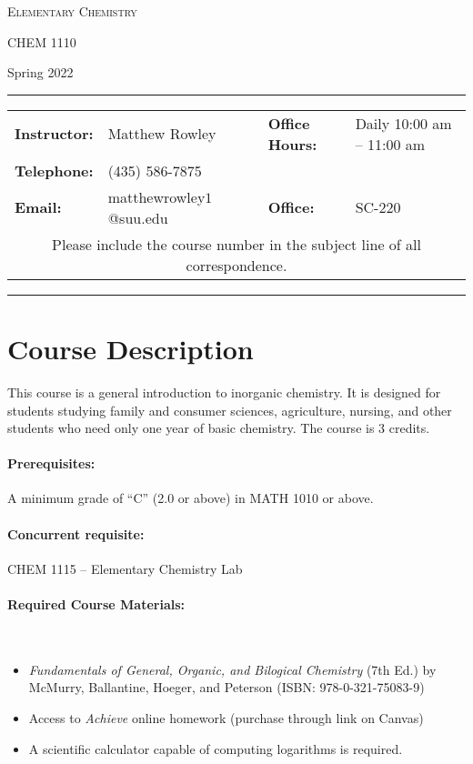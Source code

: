 \documentclass[12pt, letterpaper]{article}
\begin{document}
\begin{center}
	{\Large \textsc{Elementary Chemistry}}

	CHEM 1110
\end{center}
\begin{center}
	{\large Spring 2022}
\end{center}
\begin{center}
	\rule{0.99\textwidth}{0.4pt}
	\begin{tabular}{llcll}
		\textbf{Instructor:} & Matthew Rowley & & \textbf{Office Hours:} & Daily 10:00 am -- 11:00 am \\
		\textbf{Telephone:} & (435) 586-7875 & & & \\
		\textbf{Email:} & matthewrowley$1$@suu.edu  & & \textbf{Office:} & SC-220\\
		\multicolumn{5}{c}{Please include the course number in the subject line of all correspondence.} 
	\end{tabular}
	\rule{0.99\textwidth}{0.4pt}
\end{center}

\section*{Course Description} 
This course is a general introduction to inorganic chemistry. It is designed for students studying family and consumer sciences, agriculture, nursing, and other students who need only one year of basic chemistry. The course is 3 credits.

\paragraph{Prerequisites:}
A minimum grade of ``C'' (2.0 or above) in MATH 1010 or above.

\paragraph{Concurrent requisite:}
CHEM 1115 -- Elementary Chemistry Lab

\paragraph{Required Course Materials:} ~

\begin{itemize}
\item \emph{Fundamentals of General, Organic, and Bilogical Chemistry} (7th Ed.) by McMurry, Ballantine, Hoeger, and Peterson (ISBN: 978-0-321-75083-9)
\item Access to \emph{Achieve} online homework (purchase through link on Canvas) 
\item A scientific calculator capable of computing logarithms is required.
\end{itemize}
\end{document}
